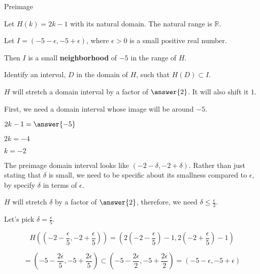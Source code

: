 \documentclass{ximera}
\begin{document}
\begin{example} Preimage

Let $H(k) = 2k - 1$ with its natural domain.  The natural range is $\mathbb{R}$.

Let  $I = (-5-\epsilon, -5+\epsilon)$, where $\epsilon > 0$ is a small positive real number.  

Then $I$ is a small \textbf{neighborhood} of $-5$ in the range of $H$.


Identify an interval, $D$ in the domain of $H$, such that $H(D) \subset I$.

\begin{explanation}





$H$ will stretch a domain interval by a factor of $\answer{2}$.  It will also shift it $1$.  


First, we need a domain interval whose image will be around $-5$.

$2k - 1 = \answer{-5}$

$2k = -4$

$k = -2$



The preimage domain interval looks like $\left( -2 - \delta, -2 + \delta \right)$.  Rather than just stating that $\delta$ is small, we need to be specific about its smallness compared to $\epsilon$, by specify $\delta$ in terms of $\epsilon$.

$H$ will stretch $\delta$ by a factor of $\answer{2}$, therefore,  we need $\delta \leq \frac{\epsilon}{2}$.   

Let's pick $\delta = \frac{\epsilon}{5}$. 




\[   H \left( \left( -2 - \frac{\epsilon}{5}, -2 + \frac{\epsilon}{5} \right) \right)  = \left( 2\left(-2 - \frac{\epsilon}{5}\right) - 1, 2\left(-2 + \frac{\epsilon}{5}\right) - 1  \right)\]


\[    = \left( -5 - \frac{2 \epsilon}{5} , -5 + \frac{2 \epsilon}{5} \right) \subset \left( -5 - \frac{2 \epsilon}{2} , -5 + \frac{2 \epsilon}{2} \right)  = (-5-\epsilon, -5+\epsilon) \]



\end{explanation}
\end{example}
\end{document}
